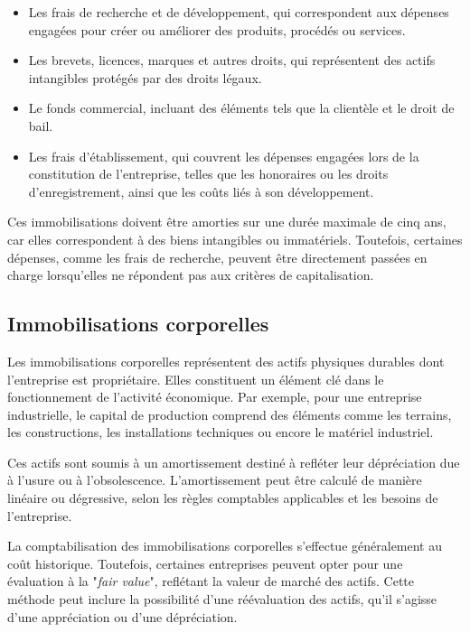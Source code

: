 \documentclass[a4paper, 12pt]{report}
\begin{document}
\begin{itemize}
	\item Les frais de recherche et de développement, qui correspondent aux dépenses engagées pour créer ou améliorer des produits, procédés ou services.

	\item Les brevets, licences, marques et autres droits, qui représentent des actifs intangibles protégés par des droits légaux.

	\item Le fonds commercial, incluant des éléments tels que la clientèle et le droit de bail.

	\item Les frais d’établissement, qui couvrent les dépenses engagées lors de la constitution de l’entreprise, telles que les honoraires ou les droits d’enregistrement, ainsi que les coûts liés à son développement.

\end{itemize}
Ces immobilisations doivent être amorties sur une durée maximale de cinq ans, car elles correspondent à des biens intangibles ou immatériels. Toutefois, certaines dépenses, comme les frais de recherche, peuvent être directement passées en charge lorsqu'elles ne répondent pas aux critères de capitalisation.

\subsection{Immobilisations corporelles}

Les immobilisations corporelles représentent des actifs physiques durables dont l'entreprise est propriétaire. Elles constituent un élément clé dans le fonctionnement de l'activité économique. Par exemple, pour une entreprise industrielle, le capital de production comprend des éléments comme les terrains, les constructions, les installations techniques ou encore le matériel industriel.

Ces actifs sont soumis à un amortissement destiné à refléter leur dépréciation due à l'usure ou à l'obsolescence. L'amortissement peut être calculé de manière linéaire ou dégressive, selon les règles comptables applicables et les besoins de l'entreprise. 

La comptabilisation des immobilisations corporelles s'effectue généralement au coût historique. Toutefois, certaines entreprises peuvent opter pour une évaluation à la "\textit{fair value}", reflétant la valeur de marché des actifs. Cette méthode peut inclure la possibilité d’une réévaluation des actifs, qu'il s'agisse d’une appréciation ou d’une dépréciation.
\end{document}
